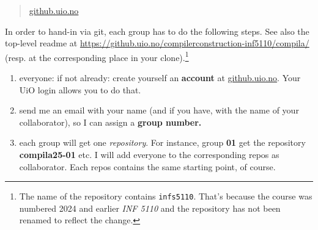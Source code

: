 \documentclass[10pt,freeform]{handout}[2014/08/13]
\begin{document}
\begin{quote}
  \url{github.uio.no}
\end{quote}


In order to hand-in via git, each group has to do the following steps. See
also the top-level readme at
\url{https://github.uio.no/compilerconstruction-inf5110/compila/} (resp. at
the corresponding place in your clone).\footnote{The name of the repository
  contains \texttt{infs5110}.  That's because the course was numbered 2024
  and earlier \textit{INF 5110} and the repository has not been renamed to
  reflect the change.}

\begin{enumerate}
\item everyone: if not already: create yourself an \textbf{account} at
  \url{github.uio.no}. Your UiO login allows you to do that.
\item send me an email with your name (and if you have, with the name of
  your collaborator), so I can assign a \textbf{group number.}
\item each group will get one \emph{repository}. For instance, group
  \textbf{01} get the repository \textbf{compila25-01} etc.  I will add
  everyone to the corresponding repos as collaborator. Each repos contains
  the same starting point, of course.
\end{enumerate}
\end{document}
